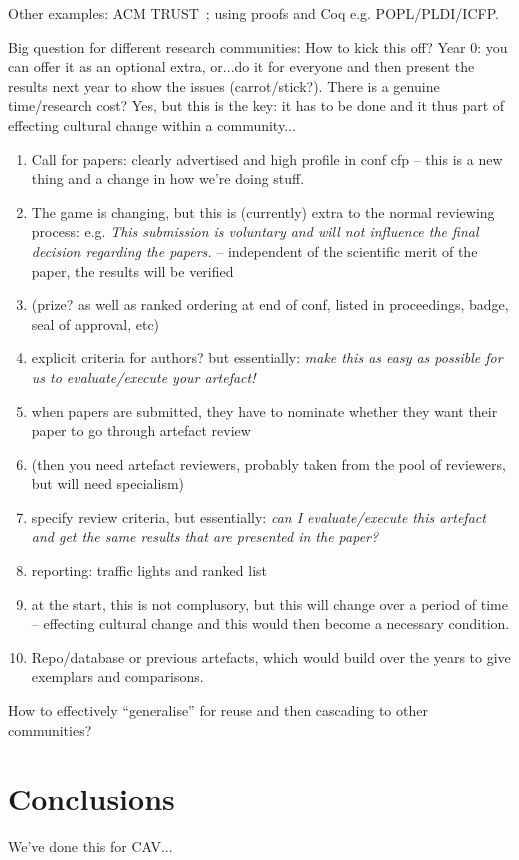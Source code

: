 \documentclass{llncs}
\begin{document}
Other examples: ACM TRUST~\cite{fursin+dubach:2014}; using proofs and
Coq e.g. POPL/PLDI/ICFP.


Big question for different research communities: How to kick this off?
Year 0: you can offer it as an optional extra, or...do it for everyone
and then present the results next year to show the issues
(carrot/stick?). There is a genuine time/research cost? Yes, but this
is the key: it has to be done and it thus part of effecting cultural
change within a community...

\begin{enumerate}
\item Call for papers: clearly advertised and high profile in conf cfp
  -- this is a new thing and a change in how we're doing stuff.
\item The game is changing, but this is (currently) extra to the
  normal reviewing process: 
e.g. {\emph{This submission is voluntary and will not influence the final decision
regarding the papers.}} -- independent of the scientific merit of the
paper, the results will be verified 
\item (prize? as well as ranked ordering at end of conf, listed in
  proceedings, badge, seal of approval, etc)
\item explicit criteria for authors? but essentially: {\emph{make this
      as easy as possible for us to evaluate/execute your artefact!}}
\item when papers are submitted, they have to nominate whether they
  want their paper to go through artefact review
\item (then you need artefact reviewers, probably taken from the pool of
  reviewers, but will need specialism)
\item specify review criteria, but essentially: {\emph{can I evaluate/execute this
  artefact and get the same results that are presented in the paper?}}
\item reporting: traffic lights and ranked list
\item at the start, this is not complusory, but this will change over a period of
time -- effecting cultural change and this would then become a
necessary condition.
\item Repo/database or previous artefacts, which would build over the
  years to give exemplars and comparisons.
\end{enumerate}

How to effectively ``generalise'' for reuse and then cascading to other communities?

\section{Conclusions}\label{concl}
We've done this for CAV...





\end{document}
